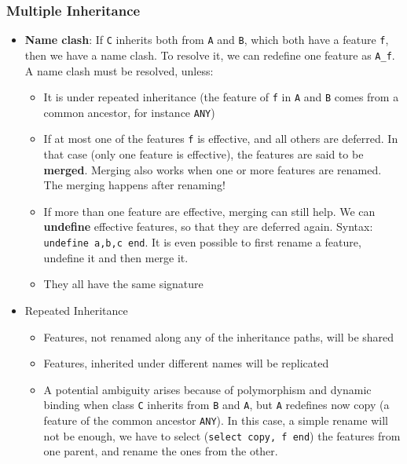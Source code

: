 \documentclass[a4paper]{article}
\newcommand{\inline}[1]{\lstinline!#1!}%
\begin{document}
\subsubsection{Multiple Inheritance}
\begin{itemize}
\item \textbf{Name clash}: If \inline{C} inherits both from \inline{A} and \inline{B}, which both have a feature \inline{f}, then we have a name clash. To resolve it, we can redefine one feature as \inline{A_f}. A name clash must be resolved, unless:
\begin{itemize}
\item It is under repeated inheritance (the feature of \inline{f} in \inline{A} and \inline{B} comes from a common ancestor, for instance \inline{ANY})
\item If at most one of the features \inline{f} is effective, and all others are deferred. In that case (only one feature is effective), the features are said to be \textbf{merged}. Merging also works when one or more features are renamed. The merging happens after renaming!
\item If more than one feature are effective, merging can still help. We can \textbf{undefine} effective features, so that they are deferred again. Syntax: \inline{undefine a,b,c end}. It is even possible to first rename a feature, undefine it and then merge it. 
\item They all have the same signature
\end{itemize}
\item Repeated Inheritance
\begin{itemize}
\item Features, not renamed along any of the inheritance paths, will be shared
\item Features, inherited under different names will be replicated
\item A potential ambiguity arises because of polymorphism and dynamic binding when class \inline{C} inherits from \inline{B} and \inline{A}, but \inline{A} redefines now copy (a feature of the common ancestor \inline{ANY}). In this case, a simple rename will not be enough, we have to select (\inline{select copy, f end}) the features from one parent, and rename the ones from the other.
\end{itemize}
\end{itemize}
\end{document}
